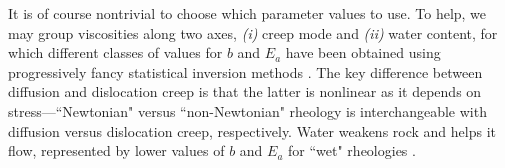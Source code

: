 It is of course nontrivial to choose which parameter values to use. To help, we may group viscosities along two axes, \textit{(i)} creep mode and \textit{(ii)} water content, for which different classes of values for $b$ and $E_a$ have been obtained using progressively fancy statistical inversion methods \citep{Karato1993, Korenaga2008, Karato2010, Mullet2015, Jain2019}. The key difference between diffusion and dislocation creep is that the latter is nonlinear as it depends on stress---``Newtonian" versus ``non-Newtonian" rheology is interchangeable with diffusion versus dislocation creep, respectively. Water weakens rock and helps it flow, represented by lower values of $b$ and $E_a$ for ``wet" rheologies \citep{Karato1993}.

%
%
%


